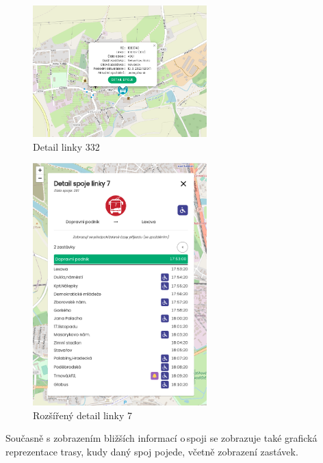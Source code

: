 \begin{figure}[H]
    \centering
    \includegraphics[width=0.6\textwidth]{images/small_detail.png}
    \caption{Detail linky 332}
    \label{detail332}
\end{figure}

\begin{figure}[H]
    \centering
    \includegraphics[width=0.6\textwidth]{images/global_pce_con_detail_7.png}
    \caption{Rozšířený detail linky 7}
    \label{detail7}
\end{figure}

Současně s zobrazením bližších informací o\,spoji se zobrazuje také grafická reprezentace trasy, kudy daný spoj pojede, včetně zobrazení zastávek.

